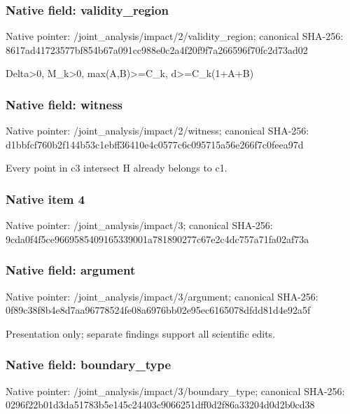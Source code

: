 \documentclass[10pt,a4paper]{article}
\begin{document}
\subsubsection{Native field: validity\_\allowbreak{}region}
Native pointer: /joint\_\allowbreak{}analysis/impact/2/validity\_\allowbreak{}region; canonical SHA-256: 8617ad41723577bf854b67a091cc988e0c2a4f20f9f7a266596f70fc2d73ad02

\begingroup\raggedright\sloppy Delta>0,\allowbreak{} M\_\allowbreak{}k>0,\allowbreak{} max(A,\allowbreak{}B)>=\allowbreak{}C\_\allowbreak{}k,\allowbreak{} d>=\allowbreak{}C\_\allowbreak{}k(1+A+B)\par\endgroup

\subsubsection{Native field: witness}
Native pointer: /joint\_\allowbreak{}analysis/impact/2/witness; canonical SHA-256: d1bbfcf760b2f144b53c1ebff36410e4c0577c6c095715a56e266f7c0feea97d

\begingroup\raggedright\sloppy Every point in c3 intersect H already belongs to c1.\par\endgroup

\subsubsection{Native item 4}
Native pointer: /joint\_\allowbreak{}analysis/impact/3; canonical SHA-256: 9cda0f4f5ce9669585409165339001a781890277c67e2c4dc757a71fa02af73a

\subsubsection{Native field: argument}
Native pointer: /joint\_\allowbreak{}analysis/impact/3/argument; canonical SHA-256: 0f89c38f8b4e8d7aa96778524fe08a6976bb02e95ec6165078dfdd81d4e92a5f

\begingroup\raggedright\sloppy Presentation only;\allowbreak{} separate findings support all scientific edits.\par\endgroup

\subsubsection{Native field: boundary\_\allowbreak{}type}
Native pointer: /joint\_\allowbreak{}analysis/impact/3/boundary\_\allowbreak{}type; canonical SHA-256: 0296f22b01d3da51783b5e145c24403c9066251dff0d2f86a33204d0d2b0cd38
\end{document}

